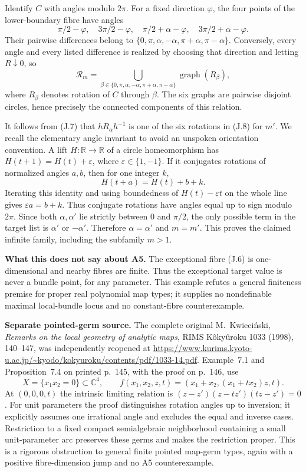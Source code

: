 Identify $C$ with angles modulo $2\pi$. For a fixed direction
$\varphi$, the four points of the lower-boundary fibre have angles
\[
 \pi/2-\varphi,\quad 3\pi/2-\varphi,\quad
 \pi/2+\alpha-\varphi,\quad 3\pi/2+\alpha-\varphi.
\]
Their pairwise differences belong to
$\{0,\pi,\alpha,-\alpha,\pi+\alpha,\pi-\alpha\}$.
Conversely, every angle and every listed difference is realized by
choosing that direction and letting $R\downarrow0$, so
\[
 \mathcal R_m=\bigcup_{\beta\in
 \{0,\pi,\alpha,-\alpha,\pi+\alpha,\pi-\alpha\}}
                  \operatorname{graph}(R_\beta),
\tag{J.8}
\]
where $R_\beta$ denotes rotation of $C$ through $\beta$.
The six graphs are pairwise disjoint circles, hence precisely the
connected components of this relation.

It follows from (J.7) that $hR_\alpha h^{-1}$ is one of the six
rotations in (J.8) for $m'$. We recall the elementary angle invariant
to avoid an unspoken orientation convention. A lift $H:\mathbb R\to
\mathbb R$ of a circle homeomorphism has
$H(t+1)=H(t)+\varepsilon$, where $\varepsilon\in\{1,-1\}$.
If it conjugates rotations of normalized angles $a,b$, then for one
integer $k$,
\[
 H(t+a)=H(t)+b+k.
\]
Iterating this identity and using boundedness of $H(t)-\varepsilon t$
on the whole line gives $\varepsilon a=b+k$. Thus conjugate rotations
have angles equal up to sign modulo $2\pi$. Since both
$\alpha,\alpha'$ lie strictly between $0$ and $\pi/2$, the only
possible term in the target list is $\alpha'$ or $-\alpha'$.
Therefore $\alpha=\alpha'$ and $m=m'$. This proves the claimed
infinite family, including the subfamily $m>1$.

\textbf{What this does not say about A5.}\quad
The exceptional fibre (J.6) is one-dimensional and nearby fibres are
finite. Thus the exceptional target value is never a bundle point,
for any parameter. This example refutes a general finiteness premise
for proper real polynomial map types; it supplies no nondefinable
maximal local-bundle locus and no constant-fibre counterexample.

\textbf{Separate pointed-germ source.}\quad
The complete original M.~Kwieci\'nski, \emph{Remarks on the local
geometry of analytic maps}, RIMS K\^oky\^uroku 1033 (1998), 140--147,
was independently reopened at
\url{https://www.kurims.kyoto-u.ac.jp/~kyodo/kokyuroku/contents/pdf/1033-14.pdf}.
Example~7.1 and Proposition~7.4 on printed p.~145, with the proof on
p.~146, use
\[
 X=\{x_1x_2=0\}\subset\mathbb C^4,\qquad
 f(x_1,x_2,z,t)=(x_1+x_2,(x_1+t x_2)z,t).
\]
At $(0,0,0,t)$ the intrinsic limiting relation is
$(z-z')(z-tz')(tz-z')=0$. For unit parameters the proof distinguishes
rotation angles up to inversion; it explicitly assumes one irrational
angle and excludes the equal and inverse cases. Restriction to a fixed
compact semialgebraic neighborhood containing a small unit-parameter
arc preserves these germs and makes the restriction proper. This is
a rigorous obstruction to general finite pointed map-germ types,
again with a positive fibre-dimension jump and no A5 counterexample.
